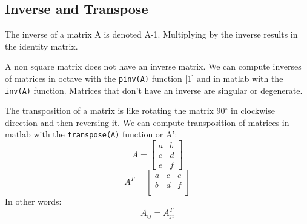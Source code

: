 \subsection{Inverse and Transpose}
The inverse of a matrix A is denoted A-1. Multiplying by the inverse results in the identity matrix.

A non square matrix does not have an inverse matrix. We can compute inverses of matrices in octave with the \verb|pinv(A)| function [1] and in matlab with the \verb|inv(A)| function. Matrices that don't have an inverse are singular or degenerate.

The transposition of a matrix is like rotating the matrix 90$^{\circ}$  in clockwise direction and then reversing it. We can compute transposition of matrices in matlab with the \verb|transpose(A)| function or A':
\[
A =  \begin{bmatrix}  a & b \\   c & d \\   e & f \end{bmatrix}
\]
\[
A^T = \begin{bmatrix} a & c & e \\ b & d & f \\ \end{bmatrix}
\]
In other words:
\[
A_{ij} = A^T_{ji}
\]